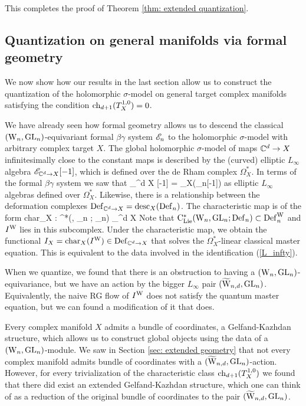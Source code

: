 \documentclass[10pt]{amsart}
\begin{document}
This completes the proof of Theorem \ref{thm: extended quantization}.

\subsection{Quantization on general manifolds via formal geometry}

We now show how our results in the last section allow us to construct the quantization of the holomorphic $\sigma$-model on general target complex manifolds satisfying the condition ${\rm ch}_{d+1}(T_X^{1,0}) = 0$.

We have already seen how formal geometry allows us to descend the classical $({{\rm W}_n},{\rm GL}_n)$-equivariant formal $\beta\gamma$ system $\mathscr E_n$ to the holomorphic $\sigma$-model with arbitrary complex target $X$.
The global holomorphic $\sigma$-model of maps $\mathbb C^d \to X$ infinitesimally close to the constant maps is described by the (curved) elliptic $L_\infty$ algebra $\mathscr E_{\mathbb C^d \to X} [-1]$, which is defined over the de Rham complex $\Omega^*_X$. 
In terms of the formal $\beta\gamma$ system we saw that 
\be\label{L_infty}
\sE_{\CC^d \to X} [-1] = \ddesc_X(\sE_n[-1])
\ee
as elliptic $L_\infty$ algebras defined over $\Omega^*_X$.
Likewise, there is a relationship between the deformation complexes ${\rm Def}_{\mathbb C^d \to X} = {\rm desc}_X({\rm Def}_n)$. 
The characteristic map is of the form
\ben
{\rm char}_X : \clie^*(\Vect, \GL_n ; \Def_n) \to \Def_{\CC^d \to X}
\een
Note that ${\rm C}_{{\rm Lie}}^*({{\rm W}_n}, {\rm GL}_n ; {\rm Def}_n) \subset {\rm Def}_n^{\rm W}$ and $I^{\rm W}$ lies in this subcomplex. 
Under the characteristic map, we obtain the functional $I_X = {\rm char}_X(I^{\rm W}) \in {\rm Def}_{\mathbb C^d \to X}$ that solves the $\Omega^*_X$-linear classical master equation.
This is equivalent to the data involved in the identification (\ref{L_infty}).
 
When we quantize, we found that there is an obstruction to having a $({{\rm W}_n},{\rm GL}_n)$-equivariance, but we have an action by the bigger $L_\infty$ pair $(\widetilde{\rm W}_{n,d}, {\rm GL}_n)$. 
Equivalently, the naive RG flow of $I^{\rm W}$ does not satisfy the quantum master equation, but we can found a modification of it that does. 

Every complex manifold $X$ admits a bundle of coordinates, a Gelfand-Kazhdan structure, which allows us to construct global objects using the data of a $({{\rm W}_n},{\rm GL}_n)$-module.
We saw in Section \ref{sec: extended geometry} that not every complex manifold admits bundle of coordinates with a $(\widetilde{\rm W}_{n,d}, {\rm GL}_n)$-action.
However, for every trivialization of the characteristic class ${\rm ch}_{d+1}(T_X^{1,0})$ we found that there did exist an extended Gelfand-Kazhdan structure, which one can think of as a reduction of the original bundle of coordinates to the pair $(\widetilde{\rm W}_{n,d}, {\rm GL}_n)$. 
\end{document}
